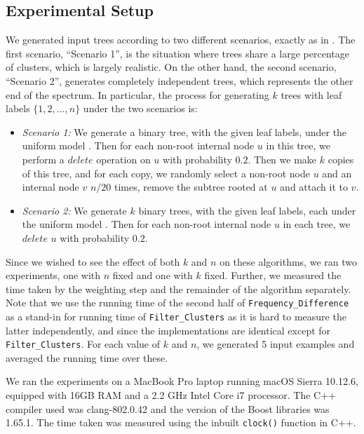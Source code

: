 \documentclass{article}
\begin{document}
    \subsection{Experimental Setup}
    \label{subsec:setup}

    We generated input trees according to two different scenarios, exactly as in \cite{jansson2018algorithms}. The first scenario, ``Scenario 1'', is the situation where trees share a large percentage of clusters, which is largely realistic. On the other hand, the second scenario, ``Scenario 2'', generates completely independent trees, which represents the other end of the spectrum. In particular, the process for generating $k$ trees with leaf labels $\{1, 2, \dots, n\}$ under the two scenarios is:

    \begin{itemize}
        \item \textit{Scenario 1:} We generate a binary tree, with the given leaf labels, under the uniform model \cite{mckenzie2000distributions}. Then for each non-root internal node $u$ in this tree, we perform a $delete$ operation on $u$ with probability $0.2$. Then we make $k$ copies of this tree, and for each copy, we randomly select a non-root node $u$ and an internal node $v$ $n / 20$ times, remove the subtree rooted at $u$ and attach it to $v$.

        \item \textit {Scenario 2:} We generate $k$ binary trees, with the given leaf labels, each under the uniform model \cite{mckenzie2000distributions}. Then for each non-root internal node $u$ in each tree, we $delete$ $u$ with probability $0.2$.
    \end{itemize}

    Since we wished to see the effect of both $k$ and $n$ on these algorithms, we ran two experiments, one with $n$ fixed and one with $k$ fixed. Further, we measured the time taken by the weighting step and the remainder of the algorithm separately. Note that we use the running time of the second half of \texttt{Frequency\_Difference} as a stand-in for running time of \texttt{Filter\_Clusters} as it is hard to measure the latter independently, and since the implementations are identical except for \texttt{Filter\_Clusters}. For each value of $k$ and $n$, we generated 5 input examples and averaged the running time over these.

    We ran the experiments on a MacBook Pro laptop running macOS Sierra 10.12.6, equipped with 16GB RAM and a 2.2 GHz Intel Core i7 processor. The C++ compiler used was clang-802.0.42 and the version of the Boost libraries was 1.65.1. The time taken was measured using the inbuilt \texttt{clock()} function in C++.
\end{document}
